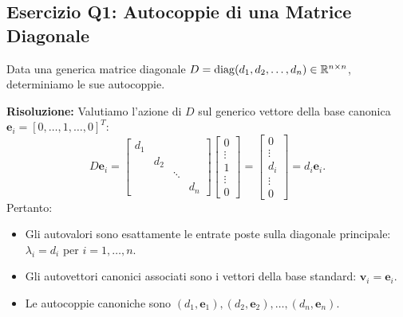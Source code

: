 \subsection{Esercizio Q1: Autocoppie di una Matrice Diagonale}

\begin{example}
\label{ex:q1-matrice-diagonale}
Data una generica matrice diagonale $D = \operatorname{diag}(d_1, d_2, \dots, d_n) \in \mathbb{R}^{n \times n}$, determiniamo le sue autocoppie.

\noindent\textbf{Risoluzione:}
Valutiamo l'azione di $D$ sul generico vettore della base canonica $\mathbf{e}_i = [0, \dots, 1, \dots, 0]^T$:
\begin{equation}
    D \mathbf{e}_i = \begin{bmatrix} d_1 & & & \\ & d_2 & & \\ & & \ddots & \\ & & & d_n \end{bmatrix} \begin{bmatrix} 0 \\ \vdots \\ 1 \\ \vdots \\ 0 \end{bmatrix} = \begin{bmatrix} 0 \\ \vdots \\ d_i \\ \vdots \\ 0 \end{bmatrix} = d_i \mathbf{e}_i.
\end{equation}
Pertanto:
\begin{itemize}
    \item Gli autovalori sono esattamente le entrate poste sulla diagonale principale: $\lambda_i = d_i$ per $i = 1, \dots, n$.
    \item Gli autovettori canonici associati sono i vettori della base standard: $\mathbf{v}_i = \mathbf{e}_i$.
    \item Le autocoppie canoniche sono $(d_1, \mathbf{e}_1), (d_2, \mathbf{e}_2), \dots, (d_n, \mathbf{e}_n)$.
\end{itemize}
\end{example}


